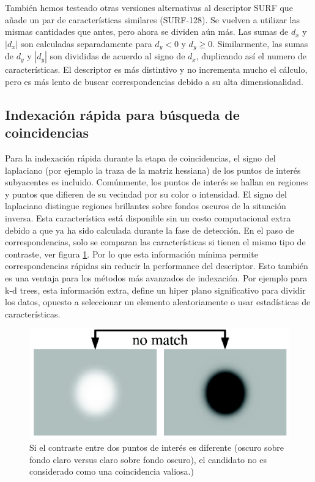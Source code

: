 También hemos testeado otras versiones alternativas al descriptor SURF que añade un par de características similares (SURF-128). Se vuelven a utilizar las mismas cantidades que antes, pero ahora se dividen aún más. Las sumas de $d_x$ y $|d_x|$ son calculadas separadamente para $d_{y}<0$ y $d_{y}\geq0$. Similarmente, las sumas de $d_{y}$ y $|d_y|$ son divididas de acuerdo al signo de $d_{x}$, duplicando así el numero de características. El descriptor es más distintivo y no incrementa mucho el cálculo, pero es más lento de buscar correspondencias debido a su alta dimensionalidad.

\subsection{Indexación rápida para búsqueda de coincidencias}
Para la indexación rápida durante la etapa de coincidencias, el signo del laplaciano (por ejemplo la traza de la matriz hessiana) de los puntos de interés subyacentes es incluido. Comúnmente, los puntos de interés se hallan en regiones y puntos que difieren de su vecindad por su color o intensidad. El signo del laplaciano distingue regiones brillantes sobre fondos oscuros de la situación inversa. Esta característica está disponible sin un costo computacional extra debido a que ya ha sido calculada durante la fase de detección. En el paso de correspondencias, solo se comparan las características si tienen el mismo tipo de contraste, ver figura \ref{fig:contrastcomparation}. Por lo que esta información mínima permite correspondencias rápidas sin reducir la performance del descriptor. Esto también es una ventaja para los métodos más avanzados de indexación. Por ejemplo para k-d trees, esta información extra, define un hiper plano significativo para dividir los datos, opuesto a seleccionar un elemento aleatoriamente o usar estadísticas de características.

\begin{figure}[tbhp]
   \centering
        \includegraphics[scale=0.4]{./figs/notmatching}
    \caption[]{Si el contraste entre dos puntos de interés es diferente (oscuro sobre fondo claro versus claro sobre fondo oscuro), el candidato no es considerado como una coincidencia valiosa.)}
   \label{fig:contrastcomparation}
\end{figure}

